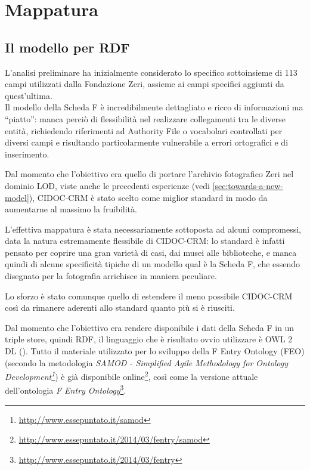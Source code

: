 \chapter{Mappatura}\label{chap:mapping}

\section{Il modello per RDF}

L'analisi preliminare ha inizialmente considerato lo specifico sottoinsieme di 113 campi utilizzati dalla Fondazione Zeri, assieme ai campi specifici aggiunti da quest'ultima.\\
Il modello della Scheda F è incredibilmente dettagliato e ricco di informazioni ma ``piatto'': manca perciò di flessibilità nel realizzare collegamenti tra le diverse entità, richiedendo riferimenti ad Authority File o vocabolari controllati per diversi campi e risultando particolarmente vulnerabile a errori ortografici e di inserimento.

Dal momento che l'obiettivo era quello di portare l'archivio fotografico Zeri nel dominio LOD, viste anche le precedenti esperienze (vedi \ref{sec:towards-a-new-model}), CIDOC-CRM è stato scelto come miglior standard in modo da aumentarne al massimo la fruibilità.

L'effettiva mappatura è stata necessariamente sottoposta ad alcuni compromessi, data la natura estremamente flessibile di CIDOC-CRM: lo standard è infatti pensato per coprire una gran varietà di casi, dai musei alle biblioteche, e manca quindi di alcune specificità tipiche di un modello qual è la Scheda F, che essendo disegnato per la fotografia arrichisce in maniera peculiare.

Lo sforzo è stato comunque quello di estendere il meno possibile CIDOC-CRM così da rimanere aderenti allo standard quanto più si è riusciti.

Dal momento che l'obiettivo era rendere disponibile i dati della Scheda F in un triple store, quindi RDF, il linguaggio che è risultato ovvio utilizzare è OWL 2 DL (\cite{8}). Tutto il materiale utilizzato per lo sviluppo della F Entry Ontology (FEO) (secondo la metodologia \emph{SAMOD - Simplified Agile Methodology for Ontology Development\footnote{\url{http://www.essepuntato.it/samod}}}) è già disponibile online\footnote{\url{http://www.essepuntato.it/2014/03/fentry/samod}}, così come la versione attuale dell'ontologia \emph{F Entry Ontology}\footnote{\url{http://www.essepuntato.it/2014/03/fentry}}.

